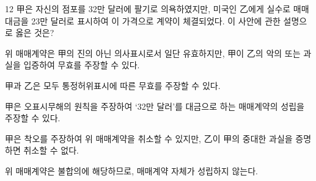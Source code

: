 \begin{question}{12}
甲은 자신의 점포를 32만 달러에 팔기로 의욕하였지만, 미국인 乙에게 실수로 매매대금을 23만 달러로 표시하여 이 가격으로 계약이 체결되었다. 이 사안에 관한 설명으로 옳은 것은?
\begin{choices}
  \item 위 매매계약은 甲의 진의 아닌 의사표시로서 일단 유효하지만, 甲이 乙의 악의 또는 과실을 입증하여 무효를 주장할 수 있다.
  \item 甲과 乙은 모두 통정허위표시에 따른 무효를 주장할 수 있다.
  \item 甲은 오표시무해의 원칙을 주장하여 ‘32만 달러’를 대금으로 하는 매매계약의 성립을 주장할 수 있다.
  \item 甲은 착오를 주장하여 위 매매계약을 취소할 수 있지만, 乙이 甲의 중대한 과실을 증명하면 취소할 수 없다.
  \item 위 매매계약은 불합의에 해당하므로, 매매계약 자체가 성립하지 않는다.
\end{choices}
\end{question}
